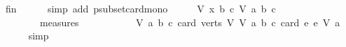 \begin{isabellebody}
\ fin\isanewline
\ \ \ \ \isamarkupfalse%
\ {\isacharparenleft}{\kern0pt}simp\ add{\isacharcolon}{\kern0pt}\ psubset{\isacharunderscore}{\kern0pt}card{\isacharunderscore}{\kern0pt}mono{\isacharparenright}{\kern0pt}\isanewline
\ \ \isamarkupfalse%
\ \isamarkupfalse%
\ {\isachardoublequoteopen}{\isacharparenleft}{\kern0pt}{\isacharparenleft}{\kern0pt}V{\isacharcomma}{\kern0pt}\ x{\isacharcomma}{\kern0pt}\ b{\isacharcomma}{\kern0pt}\ c{\isacharparenright}{\kern0pt}{\isacharcomma}{\kern0pt}\ V{\isacharcomma}{\kern0pt}\ a{\isacharcomma}{\kern0pt}\ b{\isacharcomma}{\kern0pt}\ c{\isacharparenright}{\kern0pt}\isanewline
\ \ \ \ \ \ \ {\isasymin}\ measures\isanewline
\ \ \ \ \ \ \ \ \ \ \ {\isacharbrackleft}{\kern0pt}{\isasymlambda}{\isacharparenleft}{\kern0pt}V{\isacharcomma}{\kern0pt}\ a{\isacharcomma}{\kern0pt}\ b{\isacharcomma}{\kern0pt}\ c{\isacharparenright}{\kern0pt}{\isachardot}{\kern0pt}\ card\ {\isacharparenleft}{\kern0pt}verts\ V{\isacharparenright}{\kern0pt}{\isacharcomma}{\kern0pt}\ {\isasymlambda}{\isacharparenleft}{\kern0pt}V{\isacharcomma}{\kern0pt}\ a{\isacharcomma}{\kern0pt}\ b{\isacharcomma}{\kern0pt}\ c{\isacharparenright}{\kern0pt}{\isachardot}{\kern0pt}\ card\ {\isacharbraceleft}{\kern0pt}e{\isachardot}{\kern0pt}\ e\ {\isasymrightarrow}\isactrlsup {\isacharasterisk}{\kern0pt}\isactrlbsub V\isactrlesub \ a{\isacharbraceright}{\kern0pt}{\isacharbrackright}{\kern0pt}{\isachardoublequoteclose}\isanewline
\ \ \ \ \isamarkupfalse%
\ simp\isanewline
{}\isamarkupfalse%
%
\endisatagproof
{\isafoldproof}%
%
\isadelimproof
\isanewline
%
\endisadelimproof
\isanewline
{}\isamarkupfalse%
\isanewline
%
\isadelimtheory
%
\endisadelimtheory
%
\isatagtheory
{}\isamarkupfalse%
%
\endisatagtheory
{\isafoldtheory}%
%
\isadelimtheory
%
\endisadelimtheory
%
\end{isabellebody}%
\endinput
